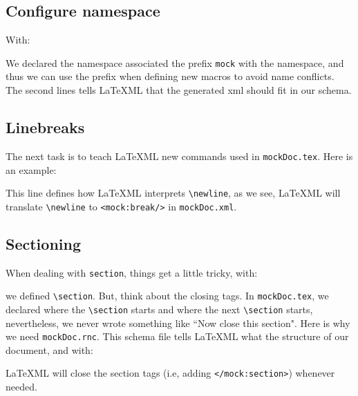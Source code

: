 \documentclass[a4paper]{article}
\def\latexml{{\LaTeX}ML\xspace}
\begin{document}
\subsection{Configure namespace}
 With:
 
 We declared the namespace associated the prefix \lstinline|mock| with the
 namespace, and thus we can use the prefix when defining new macros to avoid 
 name conflicts. The second lines tells \latexml that the generated xml should fit in our
 schema.

\subsection{Linebreaks}
The next task is to teach \latexml new commands used in \lstinline|mockDoc.tex|. Here is
an example:
 

This line defines how \latexml interprets \lstinline|\newline|, as we see,
\latexml will translate \lstinline|\newline| to \lstinline|<mock:break/>| in
\lstinline|mockDoc.xml|.

\subsection{Sectioning}
 When dealing with \lstinline|section|, things get a little tricky, with:
  
we defined \lstinline|\section|. But, think about the closing tags. In \lstinline|mockDoc.tex|, we declared where the \lstinline|\section| starts and where the next \lstinline|\section| starts, nevertheless, we never wrote something like ``Now close this section". Here is why we need \lstinline|mockDoc.rnc|. This schema file tells \latexml what the structure of our document, and with:
 
\latexml will close the section tags (i.e, adding \lstinline|</mock:section>|) whenever needed.
\end{document}
